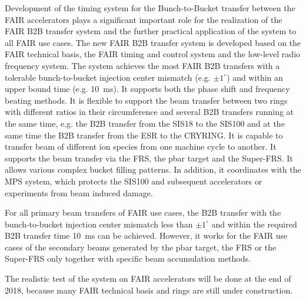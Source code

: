 Development of the timing system for the Bunch-to-Bucket transfer between the FAIR accelerators plays a significant important role for the realization of the FAIR B2B transfer system and the further practical application of the system to all FAIR use cases. The new FAIR B2B transfer system is developed based on the FAIR technical basis, the FAIR timing and control system and the low-level radio frequency system. The system achieves the most FAIR B2B transfers with a tolerable bunch-to-bucket injection center mismatch (e.g. $\pm 1^\circ$) and within an upper bound time (e.g. \SI{10}{\ms}). It supports both the phase shift and frequency beating methods. It is flexible to support the beam transfer between two rings with different ratios in their circumference and several B2B transfers running at the same time, e.g. the B2B transfer from the SIS18 to the SIS100 and at the same time the B2B transfer from the ESR to the CRYRING. It is capable to transfer beam of different ion species from one machine cycle to another. It supports the beam transfer via the FRS, the pbar target and the Super-FRS. It allows various complex bucket filling patterns. In addition, it coordinates with the MPS system, which protects the SIS100 and subsequent accelerators or experiments from beam induced damage. 

For all primary beam transfers of FAIR use cases, the B2B transfer with the bunch-to-bucket injection center mismatch less than $\pm1^\circ$ and within the required B2B transfer time \SI{10}{\ms} can be achieved. However, it works for the FAIR use cases of the secondary beams generated by the pbar target, the FRS or the Super-FRS only together with specific beam accumulation methods.

The realistic test of the system on FAIR accelerators will be done at the end of 2018, because many FAIR technical basis and rings are still under construction.

